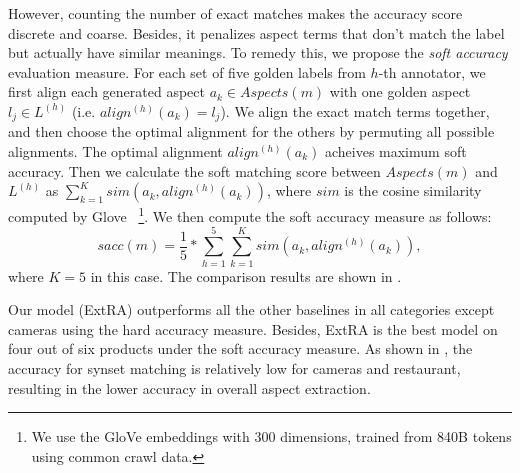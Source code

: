 However, counting the number of exact matches 
makes the accuracy score discrete and coarse. 
Besides, it penalizes aspect terms that don't match the label
but actually have similar meanings.
To remedy this, we propose the \emph{soft accuracy}  evaluation measure.
For each set of five golden labels from 
$h$-th annotator, we first align each generated aspect $a_k \in Aspects(m)$
with one golden aspect $l_j \in L^{(h)}$ (i.e. $align^{(h)}(a_{k})=l_{j}$). 
We align the exact match terms together, and then choose the optimal alignment for the others by permuting all possible alignments. 
The optimal alignment $align^{(h)}(a_k)$ acheives maximum soft accuracy.
Then we calculate the soft matching score between
$Aspects(m)$ and $L^{(h)}$ as $\sum_{k=1}^{K}sim(a_{k}, align^{(h)}(a_k))$,
where $sim$ is the cosine similarity computed by 
Glove~
\footnote{ We use the GloVe embeddings 
	with 300 dimensions, trained from 840B tokens using common crawl data. }. 
We then compute the soft accuracy measure as follows:
\begin{equation}
sacc(m) =\frac{1}{5}*\sum_{h=1}^{5}\sum_{k=1}^{K}sim(a_k, align^{(h)}(a_k)), 
\end{equation}
where $K=5$ in this case.
The comparison results are shown 
in . 

Our model (ExtRA) outperforms all the other baselines 
in all categories except cameras using the hard accuracy measure.
Besides, ExtRA is the best model on four out of six products under the 
soft accuracy measure. As shown in , the accuracy for
synset matching is relatively low for cameras and restaurant,
resulting in the lower accuracy in overall aspect extraction.

